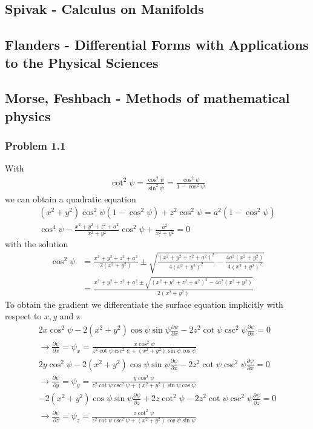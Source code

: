 \documentclass[10pt,a4paper]{book}
\theoremstyle{definition}
\begin{document}
\subsection{{\sc Spivak} - Calculus on Manifolds}
\subsection{{\sc Flanders} - Differential Forms with Applications to the Physical Sciences}
\subsection{{\sc Morse, Feshbach} - Methods of mathematical physics}
\subsubsection{Problem 1.1}
With
\begin{align}
    \cot^2\psi=\frac{\cos^2\psi}{\sin^2\psi}=\frac{\cos^2\psi}{1-\cos^2\psi}
\end{align}
we can obtain a quadratic equation
\begin{align}
    (x^2+y^2)\cos^2\psi(1-\cos^2\psi)+z^2\cos^2\psi=a^2(1-\cos^2\psi)\\
    \cos^4\psi-\frac{x^2+y^2+z^2+a^2}{x^2+y^2}\cos^2\psi+\frac{a^2}{x^2+y^2}=0
\end{align}
with the solution
\begin{align}
    \cos^2\psi
    &=\frac{x^2+y^2+z^2+a^2}{2(x^2+y^2)}\pm\sqrt{ \frac{(x^2+y^2+z^2+a^2)^2}{4(x^2+y^2)^2}-\frac{4a^2(x^2+y^2)}{4(x^2+y^2)^2}  }\\
    &=\frac{x^2+y^2+z^2+a^2\pm\sqrt{ (x^2+y^2+z^2+a^2)^2-4a^2(x^2+y^2)}}{2(x^2+y^2)}
\end{align}
To obtain the gradient we differentiate the surface equation implicitly with respect to $x,y$ and z
\begin{align}
    2x\cos^2\psi-2(x^2+y^2)\cos\psi\sin\psi\frac{\partial\psi}{\partial x}-2z^2\cot\psi\csc^2\psi\frac{\partial\psi}{\partial x}=0\\
    \rightarrow\frac{\partial\psi}{\partial x}=\psi_x=\frac{x\cos^2\psi}{z^2\cot\psi\csc^2\psi+(x^2+y^2)\sin\psi\cos\psi}\\
    2y\cos^2\psi-2(x^2+y^2)\cos\psi\sin\psi\frac{\partial\psi}{\partial x}-2z^2\cot\psi\csc^2\psi\frac{\partial\psi}{\partial x}=0\\
    \rightarrow\frac{\partial\psi}{\partial y}=\psi_y=\frac{y\cos^2\psi}{z^2\cot\psi\csc^2\psi+(x^2+y^2)\sin\psi\cos\psi}\\
    -2(x^2+y^2)\cos\psi\sin\psi\frac{\partial\psi}{\partial z}+2z\cot^2\psi-2z^2\cot\psi\csc^2\psi\frac{\partial\psi}{\partial z}=0\\
     \rightarrow\frac{\partial\psi}{\partial z}=\psi_z=\frac{z\cot^2\psi}{z^2\cot\psi\csc^2\psi + (x^2+y^2)\cos\psi\sin\psi}
\end{align}
\end{document}
